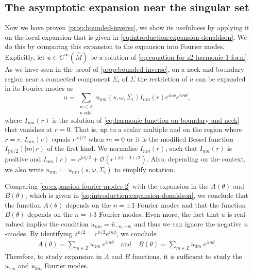 \documentclass[preprint,12pt]{elsarticle}
\numberwithin{table}{section}
\newcommand{\Z}{\mathbb{Z}}
\renewcommand{\O}{\mathcal{O}}
\begin{document}
\subsection{The asymptotic expansion near the singular set}
Now we have proven \cref{prop:bounded-inverse}, we show its usefulness by applying it on the local expansion that is given in \cref{eq:introduction:expansion-donaldson}. We do this by comparing this expansion to the expansion into Fourier modes. Explicitly, let $u \in C^{\infty}(\hat{M})$ be a solution of \cref{eq:equation-for-z2-harmonic-1-form}. As we have seen in the proof of \cref{prop:bounded-inverse}, on a neck and boundary region near a connected component $\Sigma_i$ of $\Sigma$ the restriction of $u$ can be expanded in its Fourier modes as
\begin{equation}
    \label{eq:expansion-fourier-modes-2}
    u = \sum_{\substack{m \in \Z \\ n \text{ odd}}} u_{nm}(s, \omega, \Sigma_i) I_{nm}(r) e^{in \phi} e^{im \theta},
\end{equation}
where $I_{nm}(r)$ is the solution of \cref{eq:harmonic-function-on-boundary-and-neck} that vanishes at $r = 0$. That is, up to a scalar multiple and on the region where $\tilde{r} = r$, $I_{nm}(r)$ equals $r^{|n|/2}$ when $m = 0$ or it is the modified Bessel function $I_{|n|/2}(|m| \: r)$ of the first kind.
We normalise $I_{nm}(r)$, such that $I_{nm}(r)$ is positive and $I_{nm}(r) = r^{|n|/2} + \O(r^{(|n|+1)/2})$. Also, depending on the context, we also write $u_{nm} := u_{nm}(s, \omega, \Sigma_i)$ to simplify notation.


Comparing \cref{eq:expansion-fourier-modes-2} with the expansion in the $A(\theta)$ and $B(\theta)$, which is given in \cref{eq:introduction:expansion-donaldson}, we conclude that the function $A(\theta)$ depends on the $n=\pm 1$ Fourier modes and that the function $B(\theta)$ depends on the $n=\pm 3$ Fourier modes. Even more, the fact that $u$ is real-valued implies the condition $u_{nm} = \bar{u}_{-n, -m} $ and thus we can ignore the negative $n$-modes. By identifying $z^{n/2} = r^{n/2} e^{i n \phi}$, we conclude
\begin{align}
	\label{eq:relationship-different-expansions}
    A(\theta) = \sum_{m \in \Z} u_{1m} \: e^{im \theta} 
    \quad\text{and}\quad
    B(\theta) = \sum_{m \in \Z} u_{3m} \: e^{im \theta}.
\end{align}
Therefore, to study expansion in $A$ and $B$ functions, it is sufficient to study the $u_{1m}$ and $u_{3m}$ Fourier modes.
\end{document}
